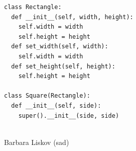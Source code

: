 \documentclass[calcdimensions,landscape,letterpaper]{powersem}
\newcommand{\thecurrentheading}{}
\newcommand{\heading}[1]{\renewcommand{\thecurrentheading}{#1}}
\begin{document}
\begin{slide}
  \heading{Liskov-Substitution - Before}
  \begin{center}
    \begin{minipage}[c]{.6\textwidth}
      \begin{verbatim}
class Rectangle:
  def __init__(self, width, height):
    self.width = width
    self.height = height
  def set_width(self, width):
    self.width = width
  def set_height(self, height):
    self.height = height

class Square(Rectangle):
  def __init__(self, side):
    super().__init__(side, side)
      \end{verbatim}
    \end{minipage}
    \begin{minipage}[c]{.35\textwidth}
      \begin{center}
        \\
        Barbara Liskov (sad)
      \end{center}
    \end{minipage}
  \end{center}
\end{slide}
\end{document}
